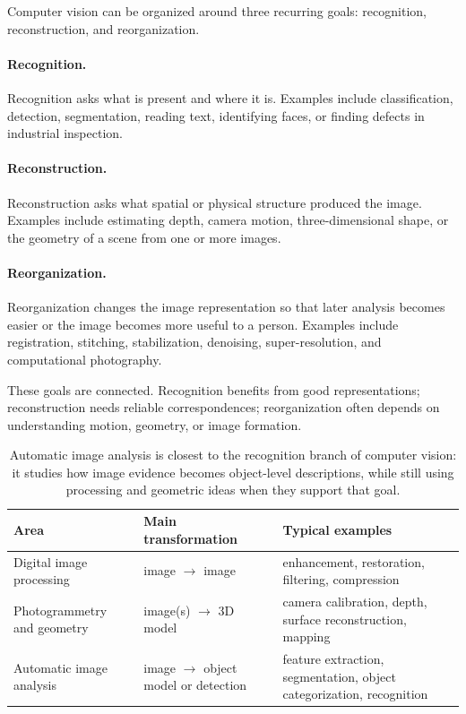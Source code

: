 Computer vision can be organized around three recurring goals: recognition,
reconstruction, and reorganization.

\paragraph{Recognition.}
Recognition asks what is present and where it is. Examples include
classification, detection, segmentation, reading text, identifying faces, or
finding defects in industrial inspection.

\paragraph{Reconstruction.}
Reconstruction asks what spatial or physical structure produced the image.
Examples include estimating depth, camera motion, three-dimensional shape, or
the geometry of a scene from one or more images.

\paragraph{Reorganization.}
Reorganization changes the image representation so that later analysis becomes
easier or the image becomes more useful to a person. Examples include
registration, stitching, stabilization, denoising, super-resolution, and
computational photography.

These goals are connected. Recognition benefits from good representations;
reconstruction needs reliable correspondences; reorganization often depends on
understanding motion, geometry, or image formation.

\begin{table}[ht]
  \centering
  \begin{tabular}{@{}p{3.3cm}p{4.8cm}p{5.2cm}@{}}
    \toprule
    Area & Main transformation & Typical examples \\
    \midrule
    Digital image processing & image $\rightarrow$ image & enhancement,
      restoration, filtering, compression \\
    Photogrammetry and geometry & image(s) $\rightarrow$ 3D model & camera
      calibration, depth, surface reconstruction, mapping \\
    Automatic image analysis & image $\rightarrow$ object model or detection &
      feature extraction, segmentation, object categorization, recognition \\
    \bottomrule
  \end{tabular}
  \caption{Automatic image analysis is closest to the recognition branch of
  computer vision: it studies how image evidence becomes object-level
  descriptions, while still using processing and geometric ideas when they
  support that goal.}
\end{table}

